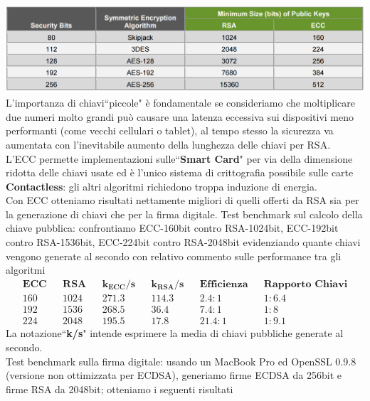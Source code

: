 \documentclass[a4paper,12pt]{tesiinfo}
\begin{document}
\includegraphics[scale=0.45]{RSAvECC_table}
\\
L'importanza di chiavi``piccole" \`e fondamentale se consideriamo che moltiplicare due numeri molto grandi pu\`o causare una latenza eccessiva sui dispositivi meno performanti (come vecchi cellulari o tablet), al tempo stesso la sicurezza va aumentata con l'inevitabile aumento della lunghezza delle chiavi per RSA.
\\
L'ECC permette implementazioni sulle``\textbf{Smart Card}" per via della dimensione ridotta delle chiavi usate ed \`e l'unico sistema di crittografia possibile sulle carte \textbf{Contactless}: gli altri algoritmi richiedono troppa induzione di energia.
\\
Con ECC otteniamo risultati nettamente migliori di quelli offerti da RSA sia per la generazione di chiavi che per la firma digitale. 
Test benchmark sul calcolo della chiave pubblica: confrontiamo ECC-160bit contro RSA-1024bit, ECC-192bit contro RSA-1536bit, ECC-224bit contro RSA-2048bit evidenziando quante chiavi vengono generate al secondo con relativo commento sulle performance tra gli algoritmi 
\begin{align*}
    &\textbf{ECC}& &\textbf{RSA}& &\textbf{$\mathbold{k_{ECC}}$/s}& &\textbf{$\mathbold{k_{RSA}}$/s}& &\textbf{Efficienza}& &\textbf{Rapporto Chiavi}&\\
    &160& &1024& &271.3& &114.3& &2.4:1& &1:6.4&\\
    &192& &1536& &268.5& &36.4& &7.4:1& &1:8&\\
    &224& &2048& &195.5& &17.8& &21.4:1& &1:9.1&
\end{align*}
La notazione``\textbf{k/s}" intende esprimere la media di chiavi pubbliche generate al secondo.
\\
Test benchmark sulla firma digitale: usando un MacBook Pro ed OpenSSL 0.9.8 (versione non ottimizzata per ECDSA), generiamo firme ECDSA da 256bit e firme RSA da 2048bit; otteniamo i seguenti risultati
\end{document}
